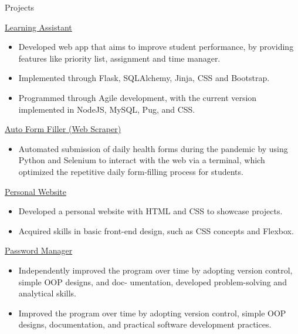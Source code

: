 \documentclass{article}
\newlength{\tabin}
\newlength{\secsep}
\newcommand{\lineunder}{\vspace*{-8pt} \\ \hspace*{-6pt} \hrulefill \\ \vspace*{-15pt}}
\newenvironment{tabbedsection}[1]{
  \begin{list}{}{
      \setlength{\itemsep}{0pt}
      \setlength{\labelsep}{0pt}
      \setlength{\labelwidth}{0pt}
      \setlength{\leftmargin}{\tabin}
      \setlength{\rightmargin}{\tabin}
      \setlength{\listparindent}{0pt}
      \setlength{\parsep}{0pt}
      \setlength{\parskip}{0pt}
      \setlength{\partopsep}{0pt}
      \setlength{\topsep}{#1}
    }
  \item[]
}{\end{list}}
\newenvironment{resume_section}[1]{
  \filbreak
  \vspace{2\secsep}
  \textsc{\large#1}
  \lineunder
  \begin{tabbedsection}{\secsep}
}{\end{tabbedsection}}
\newenvironment{resume_subsection}[2][]{
  \textbf{#2} \hfill {\footnotesize #1} \hspace{-5.1em}
  \begin{tabbedsection}{0.5\secsep}
}{\end{tabbedsection}}
\newenvironment{subitems}{
  \renewcommand{\labelitemi}{-}
  \begin{itemize}
      \setlength{\labelsep}{1em}
}{\end{itemize}}
\begin{document}
\begin{resume_section}{Projects}
  \begin{resume_subsection}[]{\href{https://github.com/TwinkletoesZen/Learning-Assistant}{Learning Assistant \faGithub}}
   \begin{subitems}
      \item Developed web app that aims to improve student performance, by providing features like priority list, assignment and time manager.
      \item Implemented through Flask, SQLAlchemy, Jinja, CSS and Bootstrap.
      \item Programmed through Agile development, with the current version implemented in NodeJS, MySQL, Pug, and CSS.
    \end{subitems}
  \end{resume_subsection}

  \begin{resume_subsection}[]{\href{https://github.com/TwinkletoesZen/Auto-HealthCheck-Completer}{Auto Form Filler (Web Scraper) \faGithub}}
    \begin{subitems}
      \item Automated submission of daily health forms during the pandemic by using Python and Selenium to interact with the web via a terminal, which optimized the repetitive daily form-filling process for students.
    \end{subitems}
  \end{resume_subsection}

  \begin{resume_subsection}[]{\href{https://github.com/TwinkletoesZen/Personal-Website}{Personal Website \faGithub}}
    \begin{subitems}
      \item Developed a personal website with HTML and CSS to showcase projects.
      \item Acquired skills in basic front-end design, such as CSS concepts and Flexbox.
    \end{subitems}
  \end{resume_subsection}

  \begin{resume_subsection}[]{\href{https://github.com/TwinkletoesZen/Password-Manager}{Password Manager \faGithub}}
    \begin{subitems}
      \item Independently improved the program over time by adopting version control, simple OOP designs, and doc-
umentation, developed problem-solving and analytical skills.
      \item Improved the program over time by adopting version control, simple OOP designs, documentation, and 
        practical software development practices.
    \end{subitems}
  \end{resume_subsection}

\end{resume_section}
\end{document}

